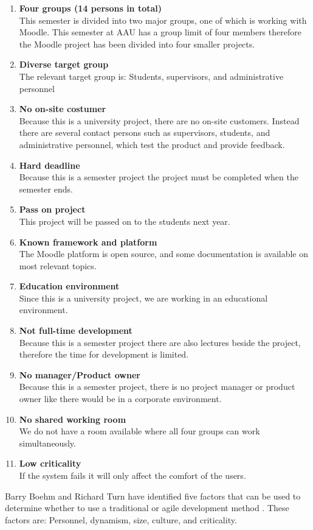 \begin{enumerate}
	\item \textbf{Four groups (14 persons in total)} \label{enum:groupSize}\\
	This semester is divided into two major groups, one of which is working with Moodle. 
	This semester at AAU has a group limit of four members therefore the Moodle project has been divided into four smaller projects.
	\item \textbf{Diverse target group} \label{enum:targetGroup}\\ 
	The relevant target group is: Students, supervisors, and administrative personnel 
	\item \textbf{No on-site costumer} \label{enum:onsite}\\
	Because this is a university project, there are no on-site customers. 
	Instead there are several contact persons such as supervisors, students, and administrative personnel, which test the product and provide feedback.
	\item \textbf{Hard deadline} \label{enum:deadline}\\
	Because this is a semester project the project must be completed when the semester ends.
	\item \textbf{Pass on project} \label{enum:passed}\\
	This project will be passed on to the students next year.
	\item \textbf{Known framework and platform} \label{enum:framework}\\
	The Moodle platform is open source, and some documentation is available on most relevant topics.
	\item \textbf{Education environment} \label{enum:education}\\
	Since this is a university project, we are working in an educational environment.
	\item \textbf{Not full-time development} \label{enum:halftime}\\
	Because this is a semester project there are also lectures beside the project, therefore the time for development is limited. 
	\item \textbf{No manager/Product owner} \label{enum:manager}\\
	Because this is a semester project, there is no project manager or product owner like there would be in a corporate environment.
	\item \textbf{No shared working room} \label{enum:room}\\
	We do not have a room available where all four groups can work simultaneously.
	\item \textbf{Low criticality} \label{enum:criticality}\\
	If the system fails it will only affect the comfort of the users.
\end{enumerate}
Barry Boehm and Richard Turn have identified five factors that can be used to determine whether to use a traditional or agile development method \citep{boehmTurner}.
These factors are: Personnel, dynamism, size, culture, and criticality.

